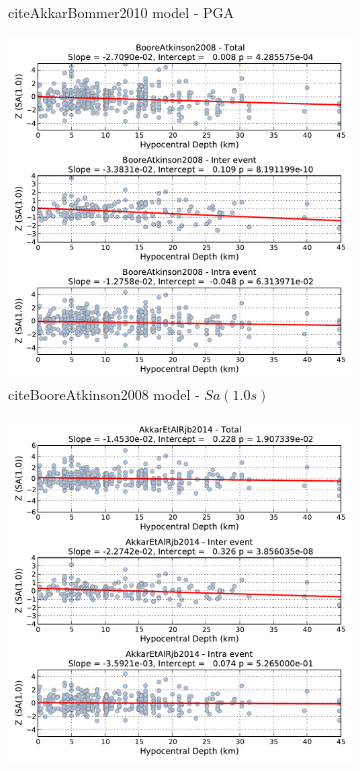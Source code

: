\begin{figure}[htb]
\begin{subfigure}[b]{0.49\textwidth}
      \caption{citeAkkarBommer2010 model - PGA}
      \label{fig:pga_depth_akkar2014}
  \end{subfigure}
    \begin{subfigure}[b]{0.49\textwidth}
      \includegraphics[width=\textwidth]{./figures/residuals/BA2008_HypoDepth_Sa1.pdf}
      \caption{citeBooreAtkinson2008 model - $Sa \left( {1.0 s} \right)$}
      \label{fig:sa1_depth_ba2008}
  \end{subfigure}
      \begin{subfigure}[b]{0.49\textwidth}
      \includegraphics[width=\textwidth]{./figures/residuals/Akkar2014_HypoDepth_Sa1.pdf}

\end{subfigure}
\end{figure}
